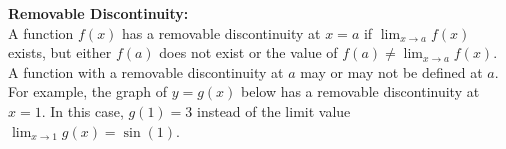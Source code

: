 \documentclass{article}
\begin{document}
            \begin{center}
            \end{center}

            \noindent \color{purple} \textbf{Removable Discontinuity:} \color{black} \\
            A function $f(x)$ has a removable discontinuity at $x=a$ if $\lim_{x\to a}f(x)$ exists,
            but either $f(a)$ does not exist or the value of $f(a)\not=\lim_{x\to a}f(x)$.
            A function with a removable discontinuity at $a$ may or may not be defined at $a$.
            For example, the graph of $y=g(x)$ below has a removable discontinuity at $x=1$.
            In this case, $g(1)=3$ instead of the limit value $\lim_{x\to1}g(x)=\sin{(1)}$. \\
\end{document}

